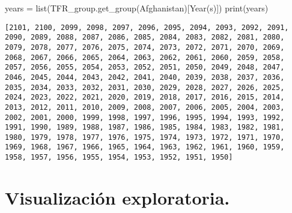 \documentclass[
  letterpaper,
  DIV=11,
  numbers=noendperiod]{scrreprt}
\newenvironment{Shaded}{\begin{snugshade}}{\end{snugshade}}
\newcommand{\BuiltInTok}[1]{\textcolor[rgb]{0.00,0.23,0.31}{#1}}
\newcommand{\NormalTok}[1]{\textcolor[rgb]{0.00,0.23,0.31}{#1}}
\newcommand{\OperatorTok}[1]{\textcolor[rgb]{0.37,0.37,0.37}{#1}}
\newcommand{\StringTok}[1]{\textcolor[rgb]{0.13,0.47,0.30}{#1}}
\begin{document}
\begin{Shaded}
\begin{Highlighting}[]
\NormalTok{years }\OperatorTok{=} \BuiltInTok{list}\NormalTok{(TFR\_group.get\_group(}\StringTok{\textquotesingle{}Afghanistan\textquotesingle{}}\NormalTok{)[}\StringTok{\textquotesingle{}Year(s)\textquotesingle{}}\NormalTok{])}
\BuiltInTok{print}\NormalTok{(years)}
\end{Highlighting}
\end{Shaded}

\begin{verbatim}
[2101, 2100, 2099, 2098, 2097, 2096, 2095, 2094, 2093, 2092, 2091, 2090, 2089, 2088, 2087, 2086, 2085, 2084, 2083, 2082, 2081, 2080, 2079, 2078, 2077, 2076, 2075, 2074, 2073, 2072, 2071, 2070, 2069, 2068, 2067, 2066, 2065, 2064, 2063, 2062, 2061, 2060, 2059, 2058, 2057, 2056, 2055, 2054, 2053, 2052, 2051, 2050, 2049, 2048, 2047, 2046, 2045, 2044, 2043, 2042, 2041, 2040, 2039, 2038, 2037, 2036, 2035, 2034, 2033, 2032, 2031, 2030, 2029, 2028, 2027, 2026, 2025, 2024, 2023, 2022, 2021, 2020, 2019, 2018, 2017, 2016, 2015, 2014, 2013, 2012, 2011, 2010, 2009, 2008, 2007, 2006, 2005, 2004, 2003, 2002, 2001, 2000, 1999, 1998, 1997, 1996, 1995, 1994, 1993, 1992, 1991, 1990, 1989, 1988, 1987, 1986, 1985, 1984, 1983, 1982, 1981, 1980, 1979, 1978, 1977, 1976, 1975, 1974, 1973, 1972, 1971, 1970, 1969, 1968, 1967, 1966, 1965, 1964, 1963, 1962, 1961, 1960, 1959, 1958, 1957, 1956, 1955, 1954, 1953, 1952, 1951, 1950]
\end{verbatim}

\section{Visualización
exploratoria.}\label{visualizaciuxf3n-exploratoria.}
\end{document}
